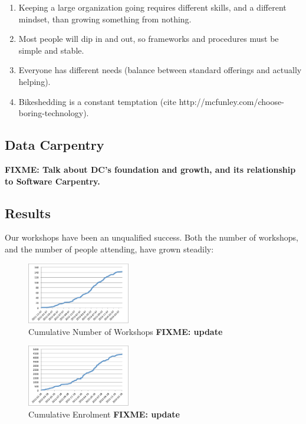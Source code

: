 \documentclass[10pt,a4paper,twocolumn]{article}
\newcommand{\fixme}[1]{\bf{FIXME: {#1}}}
\begin{document}
\begin{enumerate}

\item
  Keeping a large organization going requires different skills, and a
  different mindset, than growing something from nothing.

\item
  Most people will dip in and out, so frameworks and procedures must
  be simple and stable.

\item
  Everyone has different needs (balance between standard offerings and
  actually helping).

\item
  Bikeshedding is a constant temptation (cite
  http://mcfunley.com/choose-boring-technology).

\end{enumerate}

\subsection*{Data Carpentry}

\fixme{Talk about DC's foundation and growth, and its relationship to
  Software Carpentry.}

\subsection*{Results}

Our workshops have been an unqualified success. Both the number
of workshops, and the number of people attending, have grown steadily:

\begin{figure}
\centering
\includegraphics[width=0.4\textwidth]{workshops.pdf}
\caption{Cumulative Number of Workshops \fixme{update}}
\label{f:workshops}
\end{figure}

\begin{figure}
\centering
\includegraphics[width=0.4\textwidth]{enrolment.pdf}
\caption{Cumulative Enrolment \fixme{update}}
\label{f:enrolment}
\end{figure}
\end{document}
